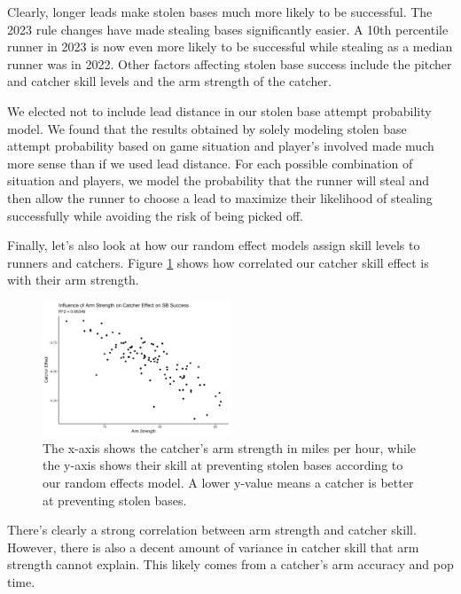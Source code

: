 \documentclass{article}
\begin{document}
        Clearly, longer leads make stolen bases much more likely to be successful. The 2023 rule changes have made stealing bases significantly easier. A 10th percentile runner in 2023 is now even more likely to be successful while stealing as a median runner was in 2022. Other factors affecting stolen base success include the pitcher and catcher skill levels and the arm strength of the catcher.


        We elected not to include lead distance in our stolen base attempt probability model. We found that the results obtained by solely modeling stolen base attempt probability based on game situation and player's involved made much more sense than if we used lead distance. For each possible combination of situation and players, we model the probability that the runner will steal and then allow the runner to choose a lead to maximize their likelihood of stealing successfully while avoiding the risk of being picked off. 

    Finally, let's also look at how our random effect models assign skill levels to runners and catchers. Figure \ref{fig:random-effect-catcher} shows how correlated our catcher skill effect is with their arm strength. 

    
        \begin{figure}
          \label{fig:random-effect-catcher}
          \centering
          \includegraphics[width = 0.5\textwidth]{figures/catcher_effect.png}
          \caption{The x-axis shows the catcher's arm strength in miles per hour, while the y-axis shows their skill at preventing stolen bases according to our random effects model. A lower y-value means a catcher is better at preventing stolen bases.}
        \end{figure}

        There's clearly a strong correlation between arm strength and catcher skill. However, there is also a decent amount of variance in catcher skill that arm strength cannot explain. This likely comes from a catcher's arm accuracy and pop time.
\end{document}
